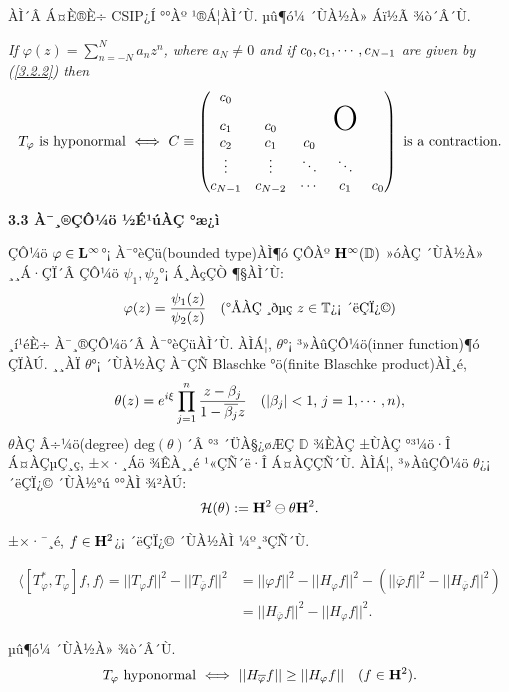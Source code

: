 \documentclass[12pt,a4paper,2sided]{article}
\newcommand{\vs}{\vspace}
\begin{document}
\newpage{} \vspace{.8 cm}


ÀÌ´Â Á¤È®È÷ CSIP¿Í °°Àº ¹®Á¦ÀÌ´Ù. µû¶ó¼­ ´ÙÀ½À» Áï½Ã ¾ò´Â´Ù.


\vs{0.2cm}{\bf Theorem 3.2.3.} {\sl If $\varphi(z)=\sum_{n=-N}^{N}
a_{n}z^n$, where $a_N\neq 0$ and if $c_0,c_1,\cdots,\linebreak
c_{N-1}$ are given by (\ref{3.2.2}) then
$$
T_\varphi\ \mbox{is hyponormal}\ \Longleftrightarrow\ C\equiv
\begin{pmatrix}
c_0\\
c_1&c_0&&\mbox{\rm{\Huge{O}}}\\
c_2&c_1&c_0\\
\vdots&\vdots&\ddots&\ddots\\
c_{N-1}&c_{N-2}&\cdots&c_1&c_0
\end{pmatrix}\ \mbox{is a contraction.}
$$}


\vs{0.3cm} { \bf 3.3 À¯¸®ÇÔ¼ö ½É¹úÀÇ °æ¿ì}

\vs{0.3cm} ÇÔ¼ö $\varphi\in \bold L^\infty$°¡ À¯°èÇü(bounded
type)ÀÌ¶ó ÇÔÀº $\bold H^\infty (\mathbb{D})$ »óÀÇ ´ÙÀ½À» ¸¸Á·ÇÏ´Â
ÇÔ¼ö $\psi_1, \psi_2$°¡ Á¸ÀçÇÒ ¶§ÀÌ´Ù:
$$
\varphi(z)=\frac{\psi_1(z)}{\psi_2(z)}\quad\hbox{(°ÅÀÇ ¸ðµç $z\in\mathbb{T}$¿¡ ´ëÇÏ¿©)}
$$
¸í¹éÈ÷ À¯¸®ÇÔ¼ö´Â À¯°èÇüÀÌ´Ù. ÀÌÁ¦, $\theta$°¡ ³»ÀûÇÔ¼ö(inner
function)¶ó ÇÏÀÚ. ¸¸ÀÏ $\theta$°¡ ´ÙÀ½ÀÇ À¯ÇÑ Blaschke °ö(finite
Blaschke product)ÀÌ¸é,
$$
\theta(z)=e^{i\xi}\prod_{j=1}^n
\frac{z-\beta_j}{1-\overline{\beta_j}z}\quad \hbox{($|\beta_j|<1$,
$j=1,\cdots,n$)},
$$
$\theta$ÀÇ Â÷¼ö(degree) $\text{deg}(\theta)$´Â °³ ´ÜÀ§¿øÆÇ $\mathbb
D$ ¾ÈÀÇ ±ÙÀÇ °³¼ö·Î Á¤ÀÇµÇ¸ç, ±×·¸Áö ¾ÊÀ¸¸é ¹«ÇÑ´ë·Î Á¤ÀÇÇÑ´Ù. ÀÌÁ¦,
³»ÀûÇÔ¼ö $\theta$¿¡ ´ëÇÏ¿© ´ÙÀ½°ú °°ÀÌ ¾²ÀÚ:
$$
\mathcal H(\theta):=\bold H^2 \ominus \theta \bold H^2.
$$

±×·¯¸é, $f\in \bold H^2$¿¡ ´ëÇÏ¿© ´ÙÀ½ÀÌ ¼º¸³ÇÑ´Ù.

\begin{align*}
\langle [T_\varphi^*,T_\varphi]f,f\rangle
=||T_\varphi f||^2-||T_{\overline{\varphi}}f||^2
&=||\varphi f||^2-||H_\varphi f||^2-(||\overline{\varphi} f||^2-||H_{\overline{\varphi}} f||^2)\\
&=||H_{\overline\varphi}f||^2-||H_\varphi f||^2.
\end{align*}

µû¶ó¼­ ´ÙÀ½À» ¾ò´Â´Ù.
$$
T_\varphi\ \text{hyponormal}\ \Longleftrightarrow\
||H_{\overline\varphi} f||\ge ||H_\varphi f||\quad (f\in \bold H^2).
$$
\newpage{}
\end{document}
